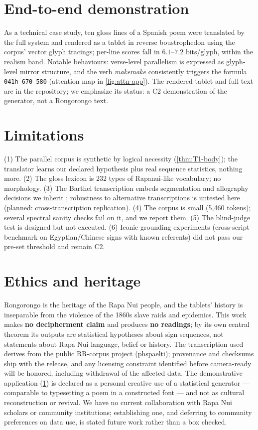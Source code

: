 \documentclass[10pt,twocolumn]{article}
\newcommand{\Ctwo}{\textsf{C2}}
\begin{document}
\section{End-to-end demonstration}
\label{sec:demo}

As a technical case study, ten gloss lines of a Spanish poem were
translated by the full system and rendered as a tablet in reverse
boustrophedon using the corpus' vector glyph tracings; per-line scores
fall in $6.1$--$7.2$ bits/glyph, within the realism band. Notable
behaviours: verse-level parallelism is expressed as glyph-level
mirror structure, and the verb \emph{makemake} consistently triggers
the formula \texttt{041h 670 580} (attention map in
\cref{fig:attn-app}). The rendered tablet and full text are in the
repository; we emphasize its status: a \Ctwo{} demonstration of the
generator, not a Rongorongo text.

\section{Limitations}
\label{sec:limitations}

(1) The parallel corpus is synthetic by logical necessity
(\cref{thm:T1-body}); the translator learns our declared hypothesis
plus real sequence statistics, nothing more. (2) The gloss lexicon is
232 types of Rapanui-like vocabulary; no morphology. (3) The Barthel
transcription embeds segmentation and allography decisions we inherit
\cite{barthel1958,horley2005}; robustness to alternative
transcriptions is untested here (planned: cross-transcription
replication). (4) The corpus is small (5{,}460 tokens); several
spectral sanity checks fail on it, and we report them. (5) The
blind-judge test is designed but not executed. (6) Iconic grounding
experiments (cross-script benchmark on Egyptian/Chinese signs with
known referents) did not pass our pre-set threshold and remain
\Ctwo{}.

\section{Ethics and heritage}
\label{sec:ethics}

Rongorongo is the heritage of the Rapa Nui people, and the tablets'
history is inseparable from the violence of the 1860s slave raids and
epidemics. This work makes \textbf{no decipherment claim} and produces
\textbf{no readings}; by its own central theorem its outputs are
statistical hypotheses about sign sequences, not statements about Rapa
Nui language, belief or history. The transcription used derives from
the public RR-corpus project (phspaelti); provenance and checksums ship
with the release, and any licensing constraint identified before
camera-ready will be honored, including withdrawal of the affected
data. The demonstrative application (\cref{sec:demo}) is declared as a
personal creative use of a statistical generator --- comparable to
typesetting a poem in a constructed font --- and not as cultural
reconstruction or revival. We have no current collaboration with Rapa
Nui scholars or community institutions; establishing one, and deferring
to community preferences on data use, is stated future work rather than
a box checked.
\end{document}
